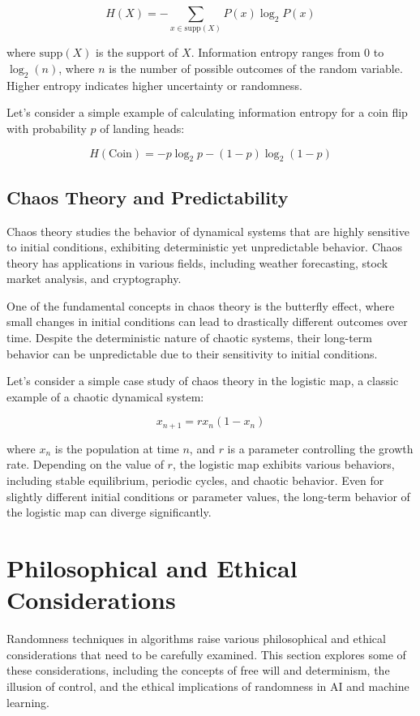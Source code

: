 \documentclass[12pt]{book} %
\begin{document}
\[
H(X) = -\sum_{x \in \text{supp}(X)} P(x) \log_2 P(x)
\]

where $\text{supp}(X)$ is the support of $X$. Information entropy ranges from 0 to $\log_2(n)$, where $n$ is the number of possible outcomes of the random variable. Higher entropy indicates higher uncertainty or randomness.

Let's consider a simple example of calculating information entropy for a coin flip with probability $p$ of landing heads:

\[
H(\text{Coin}) = -p \log_2 p - (1-p) \log_2 (1-p)
\]

\subsection{Chaos Theory and Predictability}
Chaos theory studies the behavior of dynamical systems that are highly sensitive to initial conditions, exhibiting deterministic yet unpredictable behavior. Chaos theory has applications in various fields, including weather forecasting, stock market analysis, and cryptography.

One of the fundamental concepts in chaos theory is the butterfly effect, where small changes in initial conditions can lead to drastically different outcomes over time. Despite the deterministic nature of chaotic systems, their long-term behavior can be unpredictable due to their sensitivity to initial conditions.

Let's consider a simple case study of chaos theory in the logistic map, a classic example of a chaotic dynamical system:

\[
x_{n+1} = r x_n (1 - x_n)
\]

where $x_n$ is the population at time $n$, and $r$ is a parameter controlling the growth rate. Depending on the value of $r$, the logistic map exhibits various behaviors, including stable equilibrium, periodic cycles, and chaotic behavior. Even for slightly different initial conditions or parameter values, the long-term behavior of the logistic map can diverge significantly.


\section{Philosophical and Ethical Considerations}

Randomness techniques in algorithms raise various philosophical and ethical considerations that need to be carefully examined. This section explores some of these considerations, including the concepts of free will and determinism, the illusion of control, and the ethical implications of randomness in AI and machine learning.
\end{document}
